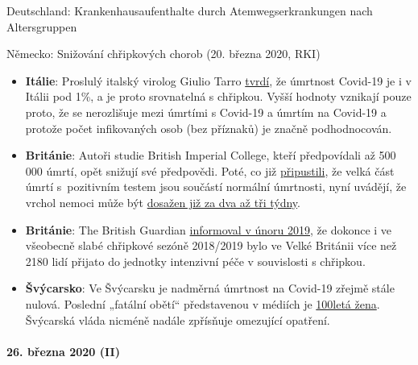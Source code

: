 Deutschland: Krankenhausaufenthalte durch Atemwegserkrankungen nach
Altersgruppen

Německo: Snižování chřipkových chorob (20. března 2020, RKI)

\begin{itemize}
\tightlist
\item
  \textbf{Itálie}: Proslulý italský virolog Giulio Tarro
  \href{https://www.cybermednews.eu/index.php/it/health/70871-interview-to-the-virologist-giulio-tarro-the-death-rate-of-covid-19-is-less-than-1-as-confirmed-by-the-national-institute-of-allergy-and-infectious-diseases}{tvrdí},
  že úmrtnost Covid-19 je i v Itálii pod 1\%, a je proto srovnatelná s
  chřipkou. Vyšší hodnoty vznikají pouze proto, že se nerozlišuje mezi
  úmrtími s Covid-19 a úmrtím na Covid-19 a protože počet infikovaných
  osob (bez příznaků) je značně podhodnocován.
\item
  \textbf{Británie}: Autoři studie British Imperial College, kteří
  předpovídali až 500 000 úmrtí, opět snižují své předpovědi. Poté, co
  již \href{https://www.bbc.com/news/health-51979654}{připustili}, že
  velká část úmrtí s~pozitivním testem jsou součástí normální úmrtnosti,
  nyní uvádějí, že vrchol nemoci může být
  \href{https://www.thetimes.co.uk/article/nhs-now-likely-to-cope-with-coronavirus-says-key-scientist-rn5m6nggk}{dosažen
  již za dva až tři týdny}.
\item
  \textbf{Británie}: The British Guardian
  \href{https://www.theguardian.com/society/2019/feb/20/britons-urged-to-get-flu-vaccine-as-critical-cases-rise-above-2000}{informoval
  v únoru 2019}, že dokonce i ve všeobecně slabé chřipkové sezóně
  2018/2019 bylo ve Velké Británii více než 2180 lidí přijato do
  jednotky intenzivní péče v souvislosti s chřipkou.
\item
  \textbf{Švýcarsko}: Ve Švýcarsku je nadměrná úmrtnost na Covid-19
  zřejmě stále nulová. Poslední „fatální obětí`` představenou v médiích
  je
  \href{https://www.nau.ch/ort/basel/drei-weitere-covid-19-todesfalle-in-basel-stadt-65684099}{100letá
  žena}. Švýcarská vláda nicméně nadále zpřísňuje omezující opatření.
\end{itemize}

\hypertarget{26-bux159ezna-2020-ii}{%
\paragraph{26. března 2020 (II)}\label{26-bux159ezna-2020-ii}}

